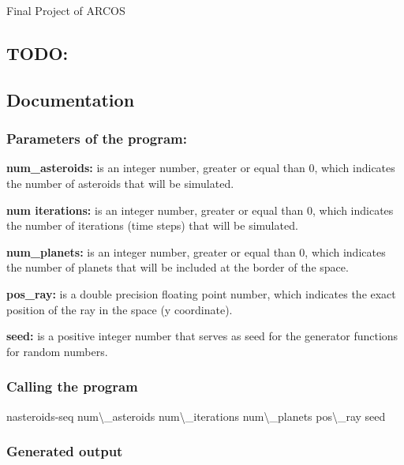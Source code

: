 \href{https://travis-ci.com/RaulOlmedoCheca/nasteroids}{\tt } \href{https://www.codacy.com?utm_source=github.com&amp;utm_medium=referral&amp;utm_content=RaulOlmedoCheca/nasteroids&amp;utm_campaign=Badge_Grade}{\tt }

Final Project of A\+R\+C\+OS

\subsection*{T\+O\+DO\+:}

\subsection*{Documentation}

\subsubsection*{Parameters of the program\+:}

{\bfseries num\+\_\+asteroids\+:} is an integer number, greater or equal than 0, which indicates the number of asteroids that will be simulated.

{\bfseries num iterations\+:} is an integer number, greater or equal than 0, which indicates the number of iterations (time steps) that will be simulated.

{\bfseries num\+\_\+planets\+:} is an integer number, greater or equal than 0, which indicates the number of planets that will be included at the border of the space.

{\bfseries pos\+\_\+ray\+:} is a double precision floating point number, which indicates the exact position of the ray in the space (y coordinate).

{\bfseries seed\+:} is a positive integer number that serves as seed for the generator functions for random numbers.

\subsubsection*{Calling the program}

{\ttfamily nasteroids-\/seq num\textbackslash{}\+\_\+asteroids num\textbackslash{}\+\_\+iterations num\textbackslash{}\+\_\+planets pos\textbackslash{}\+\_\+ray seed}

\subsubsection*{Generated output}

